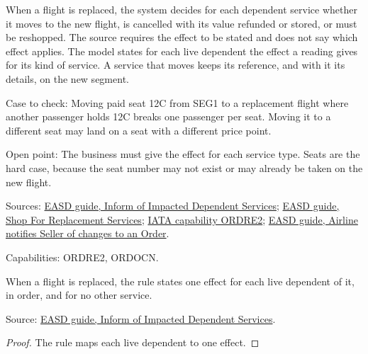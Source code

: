 \begin{definition}
  \label{def:ancillaries-flight-change-dependents}
  When a flight is replaced, the system decides for each dependent service
  whether it moves to the new flight, is cancelled with its value refunded
  or stored, or must be reshopped. The source requires the effect to be
  stated and does not say which effect applies.
  The model states for each live dependent the effect a reading gives for
  its kind of service.  A service that moves keeps its reference, and with
  it its details, on the new segment.

  Case to check: Moving paid seat 12C from SEG1 to a replacement flight
  where another passenger holds 12C breaks one passenger per seat. Moving it
  to a different seat may land on a seat with a different price point.

  Open point: The business must give the effect for each service type. Seats
  are the hard case, because the seat number may not exist or may already be
  taken on the new flight.

  Sources: \href{https://standards.atlassian.net/wiki/spaces/EASD/pages/672825400}{EASD guide, Inform of Impacted Dependent Services};
  \href{https://standards.atlassian.net/wiki/spaces/EASD/pages/574914614}{EASD guide, Shop For Replacement Services};
  \href{https://retailing.iata.org/armi/docs/ORDRE2/}{IATA capability ORDRE2};
  \href{https://standards.atlassian.net/wiki/spaces/EASD/pages/815202352}{EASD guide, Airline notifies Seller of changes to an Order}.

  Capabilities: ORDRE2, ORDOCN.
\end{definition}

\begin{theorem}
  \label{thm:ancillaries-replace-each-dependent}
  When a flight is replaced, the rule states one effect for each live
  dependent of it, in order, and for no other service.

  Source: \href{https://standards.atlassian.net/wiki/spaces/EASD/pages/672825400}{EASD guide, Inform of Impacted Dependent Services}.
\end{theorem}
\begin{proof}
  The rule maps each live dependent to one effect.
\end{proof}

